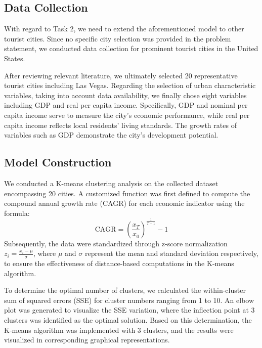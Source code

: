 \documentclass{mcmthesis}
\begin{document}
\subsection{Data Collection}
With regard to Task 2, we need to extend the aforementioned model to other tourist cities. Since no specific city selection was provided in the problem statement, we conducted data collection for prominent tourist cities in the United States. \par
After reviewing relevant literature, we ultimately selected 20 representative tourist cities including Las Vegas. Regarding the selection of urban characteristic variables, taking into account data availability, we finally chose eight variables including GDP and real per capita income. Specifically, GDP and nominal per capita income serve to measure the city's economic performance, while real per capita income reflects local residents' living standards. The growth rates of variables such as GDP demonstrate the city's development potential.
\subsection{Model Construction}
We conducted a K-means clustering analysis on the collected dataset encompassing 20 cities. A customized function was first defined to compute the compound annual growth rate (CAGR) for each economic indicator using the formula:
  $$\text{CAGR} = \left( \frac{x_T}{x_0} \right)^{\frac{1}{T-1}} - 1$$
  Subsequently, the data were standardized through z-score normalization $z_i = \frac{x_i - \mu}{\sigma}$, where $\mu$ and $\sigma$ represent the mean and standard deviation respectively, to ensure the effectiveness of distance-based computations in the K-means algorithm.
  
  To determine the optimal number of clusters, we calculated the within-cluster sum of squared errors (SSE) for cluster numbers ranging from 1 to 10. An elbow plot was generated to visualize the SSE variation, where the inflection point at 3 clusters was identified as the optimal solution. Based on this determination, the K-means algorithm was implemented with 3 clusters, and the results were visualized in corresponding graphical representations. 
\end{document}
